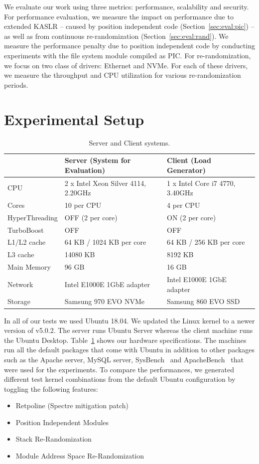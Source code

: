 We evaluate our work using three metrics: performance, scalability and security. For performance evaluation, we measure the impact on performance due to extended KASLR -- caused by position independent code (Section~\ref{sec:eval:pic}) -- as well as from continuous re-randomization (Section~\ref{sec:eval:rand}). We measure the performance penalty due to position independent code by conducting experiments with the file system module compiled as PIC. For re-randomization, we focus on two class of drivers: Ethernet and NVMe. For each of these drivers, we measure the throughput and CPU utilization for various re-randomization periods.

\section{Experimental Setup}
\begin{table}
\caption{Server and Client systems.}
\begin{center}
\begin{tabular}{ l l l }
\toprule
 & \textbf{Server (System for Evaluation)} & \textbf{Client (Load Generator)} \\
\midrule
CPU & 2 x Intel Xeon Silver 4114, 2.20GHz & 1 x Intel Core i7 4770, 3.40GHz \\
Cores & 10 per CPU & 4 per CPU \\
HyperThreading & OFF (2 per core) & ON (2 per core) \\
TurboBoost & OFF & OFF \\
L1/L2 cache & 64 KB / 1024 KB per core & 64 KB / 256 KB per core \\
L3 cache & 14080 KB & 8192 KB \\
Main Memory & 96 GB & 16 GB \\
Network & Intel E1000E 1GbE adapter & Intel E1000E 1GbE adapter \\
Storage & Samsung 970 EVO NVMe & Samsung 860 EVO SSD\\
\bottomrule
\end{tabular}
\end{center}
\label{tbl:system}
\end{table}

In all of our tests we used Ubuntu 18.04. We updated the Linux kernel to a newer version of v5.0.2. The server runs Ubuntu Server whereas the client machine runs the Ubuntu Desktop. Table~\ref{tbl:system} shows our hardware specifications. The machines run all the default packages that come with Ubuntu in addition to other packages such as the Apache server, MySQL server, SysBench~\cite{web:sysbench} and ApacheBench~\cite{APACHEBENCH} that were used for the experiments.
To compare the performances, we generated different test kernel combinations from the default Ubuntu configuration by toggling the following features:
\begin{itemize}[noitemsep]
\item Retpoline (Spectre mitigation patch)
\item Position Independent Modules
\item Stack Re-Randomization
\item Module Address Space Re-Randomization
\end{itemize}

